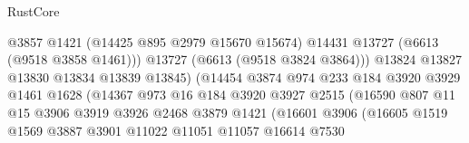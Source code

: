 \begin{lexlean}{RustCore}
\begin{coremodule}
                                            @3857
                                            @1421
                                            (@14425 @895 @2979 @15670 @15674)
                                            @14431
                                            @13727
                                            (@6613 (@9518 @3858 @1461)))
                                          @13727
                                          (@6613 (@9518 @3824 @3864)))
                                        @13824
                                        @13827
                                        @13830
                                        @13834
                                        @13839
                                        @13845)
                                      (@14454
                                        @3874
                                        @974
                                        @233
                                        @184
                                        @3920
                                        @3929
                                        @1461
                                        @1628
                                        (@14367
                                          @973
                                          @16
                                          @184
                                          @3920
                                          @3927
                                          @2515
                                          (@16590
                                            @807
                                            @11
                                            @15
                                            @3906
                                            @3919
                                            @3926
                                            @2468
                                            @3879
                                            @1421
                                            (@16601
                                              @3906
                                              (@16605
                                                @1519
                                                @1569
                                                @3887
                                                @3901
                                                @11022
                                                @11051
                                                @11057
                                                @16614
                                                @7530

\end{coremodule}
\end{lexlean}
